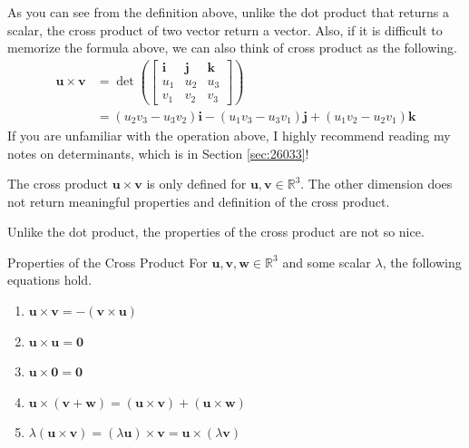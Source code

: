 \documentclass[../../main.tex]{subfiles}
\begin{document}
As you can see from the definition above, unlike the dot product
that returns a scalar, the cross product of two vector return
a vector. Also, if it is difficult to memorize the formula above,
we can also think of cross product as the following.
\begin{align*}
    \mathbf{u} \times \mathbf{v}
    &= \det\left(
        \begin{bmatrix}
            \mathbf{i} & \mathbf{j} & \mathbf{k} \\
            u_1        & u_2        & u_3        \\
            v_1        & v_2        & v_3
        \end{bmatrix}
    \right) \\
    &= (u_2v_3 - u_3v_2) \mathbf{i} - (u_1v_3 - u_3v_1) \mathbf{j}
        + (u_1v_2 - u_2v_1) \mathbf{k}
\end{align*}
If you are unfamiliar with the operation above, I highly recommend
reading my notes on determinants, which is in Section \ref{sec:26033}!

\begin{important}
The cross product $\mathbf{u} \times \mathbf{v}$ is only defined for
$\mathbf{u}, \mathbf{v} \in \mathbb{R}^3$. The other dimension does
not return meaningful properties and definition of the cross product.
\end{important}

Unlike the dot product, the properties of the cross product are
not so nice.

\begin{theorem}{}{Properties of the Cross Product}
For $\mathbf{u}, \mathbf{v}, \mathbf{w} \in \mathbb{R}^3$ and some
scalar $\lambda$, the following equations hold.
\vspace{-0.8\baselineskip}
\begin{enumerate}
\item
$\mathbf{u} \times \mathbf{v} = - (\mathbf{v} \times \mathbf{u})$
\item
$\mathbf{u} \times \mathbf{u} = \mathbf{0}$
\item
$\mathbf{u} \times \mathbf{0} = \mathbf{0}$
\item
$\mathbf{u} \times (\mathbf{v} + \mathbf{w})
= (\mathbf{u} \times \mathbf{v}) + (\mathbf{u} \times \mathbf{w})$
\item
$\lambda (\mathbf{u} \times \mathbf{v})
= (\lambda \mathbf{u}) \times \mathbf{v}
= \mathbf{u} \times (\lambda \mathbf{v})$
\end{enumerate}
\end{theorem}
\end{document}
